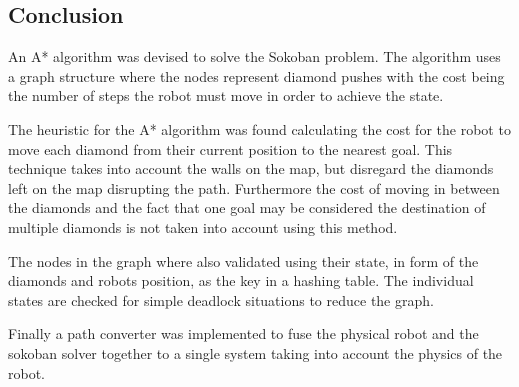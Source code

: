 \subsection{Conclusion}
An A* algorithm was devised to solve the Sokoban problem.
The algorithm uses a graph structure where the nodes represent diamond pushes with the cost being the number of steps the robot must move in order to achieve the state.

The heuristic for the A* algorithm was found calculating the cost for the robot to move each diamond from their current position to the nearest goal.
This technique takes into account the walls on the map, but disregard the diamonds left on the map disrupting the path.
Furthermore the cost of moving in between the diamonds and the fact that one goal may be considered the destination of multiple diamonds is not taken into account using this method.

The nodes in the graph where also validated using their state, in form of the diamonds and robots position, as the key in a hashing table.
The individual states are checked for simple deadlock situations to reduce the graph.

Finally a path converter was implemented to fuse the physical robot and the sokoban solver together to a single system taking into account the physics of the robot.




